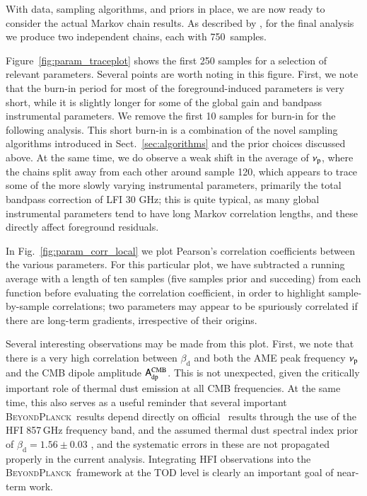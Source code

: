 \documentclass[twocolumn]{aa}
\newcommand{\A}[0]{\tens{A}}
\newcommand{\BP}{\textsc{BeyondPlanck}}
\begin{document}
With data, sampling algorithms, and priors in place, we are now ready
to consider the actual Markov chain results. As described by
\citet{bp01}, for the final analysis we produce two independent
chains, each with 750~samples.

Figure~\ref{fig:param_traceplot} shows the first 250 samples for a
selection of relevant parameters. Several points are worth noting in
this figure. First, we note that the burn-in period for most of the
foreground-induced parameters is very short, while it is slightly
longer for some of the global gain and bandpass instrumental
parameters. We remove the first 10 samples for burn-in for the
following analysis. This short burn-in is a combination of the novel
sampling algorithms introduced in Sect.~\ref{sec:algorithms} and the
prior choices discussed above. At the same time, we do observe a weak
shift in the average of $\nup$, where the chains split away from each
other around sample 120, which appears to trace some of the more
slowly varying instrumental parameters, primarily the total bandpass
correction of LFI 30 GHz; this is quite typical, as many global
instrumental parameters tend to have long Markov correlation lengths,
and these directly affect foreground residuals.

In Fig.~\ref{fig:param_corr_local} we plot Pearson's correlation
coefficients between the various parameters. For this particular plot,
we have subtracted a running average with a length of ten samples
(five samples prior and succeding) from each function before
evaluating the correlation coefficient, in order to highlight
sample-by-sample correlations; two parameters may appear to be
spuriously correlated if there are long-term gradients, irrespective
of their origins.

Several interesting observations may be made from this plot. First, we
note that there is a very high correlation between
$\beta_{\mathrm{d}}$ and both the AME peak frequency $\nup$ and the
CMB dipole amplitude $\A_{\mathrm{dp}}^{\mathrm{CMB}}$. This is not
unexpected, given the critically important role of thermal dust
emission at all CMB frequencies. At the same time, this also serves as
a useful reminder that several important \BP\ results depend directly
on official \Planck\ results through the use of the HFI 857\,GHz
frequency band, and the assumed thermal dust spectral index prior of
$\beta_{\mathrm{d}}=1.56\pm0.03$
\citep{planck2014-a12,planck2016-l04,npipe}, and the systematic errors
in these are not propagated properly in the current
analysis. Integrating HFI observations into the \BP\ framework at the
TOD level is clearly an important goal of near-term work.
\end{document}
